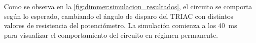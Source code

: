 Como se observa en la \cref{fig:dimmer:simulacion_resultados}, el circuito se comporta según lo esperado, cambiando el ángulo de disparo del TRIAC con distintos valores de resistencia del potenciómetro. La simulación comienza a los \SI{40}{\milli\second} para visualizar el comportamiento del circuito en régimen permanente.
